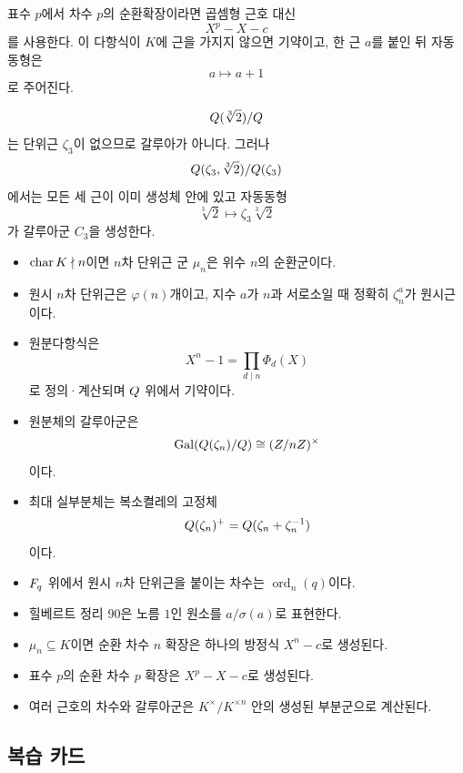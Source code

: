 표수 $p$에서 차수 $p$의 순환확장이라면 곱셈형 근호 대신
\[
  X^p-X-c
\]
를 사용한다. 이 다항식이 $K$에 근을 가지지 않으면 기약이고, 한 근 $a$를 붙인 뒤 자동동형은
\[
  a\longmapsto a+1
\]
로 주어진다.

\begin{example}[근호 가정의 차이]
\[
  Q(\sqrt[3]{2})/Q
\]
는 단위근 $\zeta_3$이 없으므로 갈루아가 아니다. 그러나
\[
  Q(\zeta_3,\sqrt[3]{2})/Q(\zeta_3)
\]
에서는 모든 세 근이 이미 생성체 안에 있고 자동동형
\[
  \sqrt[3]{2}\longmapsto\zeta_3\sqrt[3]{2}
\]
가 갈루아군 $C_3$을 생성한다.
\end{example}

\begin{chapterreview}
\begin{itemize}
  \item $\operatorname{char} K\nmid n$이면 $n$차 단위근 군 $\mu_n$은 위수 $n$의 순환군이다.
  \item 원시 $n$차 단위근은 $\varphi(n)$개이고, 지수 $a$가 $n$과 서로소일 때 정확히 $\zeta_n^a$가 원시근이다.
  \item 원분다항식은
  \[
    X^n-1=\prod_{d\mid n}\Phi_d(X)
  \]
  로 정의·계산되며 $Q$ 위에서 기약이다.
  \item 원분체의 갈루아군은
  \[
    \operatorname{Gal}(Q(\zeta_n)/Q)
    \cong(Z/nZ)^\times
  \]
  이다.
  \item 최대 실부분체는 복소켤레의 고정체
  \[
    Q(\zeta_n)^+=Q(\zeta_n+\zeta_n^{-1})
  \]
  이다.
  \item $F_q$ 위에서 원시 $n$차 단위근을 붙이는 차수는 $\operatorname{ord}_n(q)$이다.
  \item 힐베르트 정리 90은 노름 $1$인 원소를 $a/\sigma(a)$로 표현한다.
  \item $\mu_n\subseteq K$이면 순환 차수 $n$ 확장은 하나의 방정식 $X^n-c$로 생성된다.
  \item 표수 $p$의 순환 차수 $p$ 확장은 $X^p-X-c$로 생성된다.
  \item 여러 근호의 차수와 갈루아군은 $K^\times/K^{\times n}$ 안의 생성된 부분군으로 계산된다.
\end{itemize}
\end{chapterreview}

\subsection*{복습 카드}

